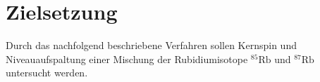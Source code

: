 \section{Zielsetzung}
\label{sec:zielsetzung}

Durch das nachfolgend beschriebene Verfahren sollen Kernspin und Niveauaufspaltung einer Mischung der Rubidiumisotope
$^{85}\text{Rb}$ und $^{87}\text{Rb}$ untersucht werden.
